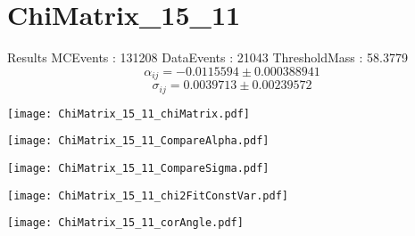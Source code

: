 \documentclass[a4paper,12pt]{article}
\begin{document}
\section{ChiMatrix\_15\_11}
\begin{minipage}{0.49\linewidth} Results \newline
MCEvents : 131208\newline
DataEvents : 21043 \newline
ThresholdMass : 58.3779\\
$$\alpha_{ij} = -0.0115594\pm 0.000388941$$
$$\sigma_{ij} = 0.0039713\pm 0.00239572$$
\end{minipage}\hfill
\begin{minipage}{0.49\linewidth} 
\texttt{[image: ChiMatrix\_15\_11\_chiMatrix.pdf]}\\
\end{minipage}
\hfill
\begin{minipage}{0.49\linewidth} 
\texttt{[image: ChiMatrix\_15\_11\_CompareAlpha.pdf]}\\
\end{minipage}
\hfill
\begin{minipage}{0.49\linewidth} 
\texttt{[image: ChiMatrix\_15\_11\_CompareSigma.pdf]}\\
\end{minipage}
\begin{minipage}{0.49\linewidth} 
\texttt{[image: ChiMatrix\_15\_11\_chi2FitConstVar.pdf]}\\
\end{minipage}
\hfill
\begin{minipage}{0.49\linewidth} 
\texttt{[image: ChiMatrix\_15\_11\_corAngle.pdf]}\\
\end{minipage}
\end{document}

